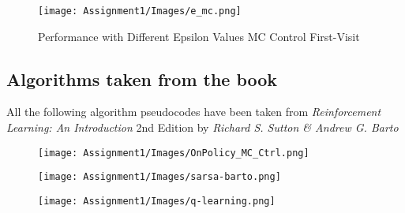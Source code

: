 \documentclass[11pt,a4paper]{article}
\begin{document}
\begin{figure}[h!]
    \centering
    \texttt{[image: Assignment1/Images/e\_mc.png]}
    \caption{Performance with Different Epsilon Values MC Control First-Visit}
    \label{fig:yourlabel}
\end{figure}

\pagebreak

\subsection{Algorithms taken from the book}

All the following algorithm pseudocodes have been taken from \textit{Reinforcement Learning: An Introduction} 2nd Edition by \textit{Richard S. Sutton \& Andrew G. Barto}

\begin{figure}[h!]
    \centering
    \texttt{[image: Assignment1/Images/OnPolicy\_MC\_Ctrl.png]}
\end{figure}

\begin{figure}[h!]
    \centering
    \texttt{[image: Assignment1/Images/sarsa-barto.png]}
\end{figure}

\begin{figure}[h!]
    \centering
    \texttt{[image: Assignment1/Images/q-learning.png]}
\end{figure}
\end{document}
